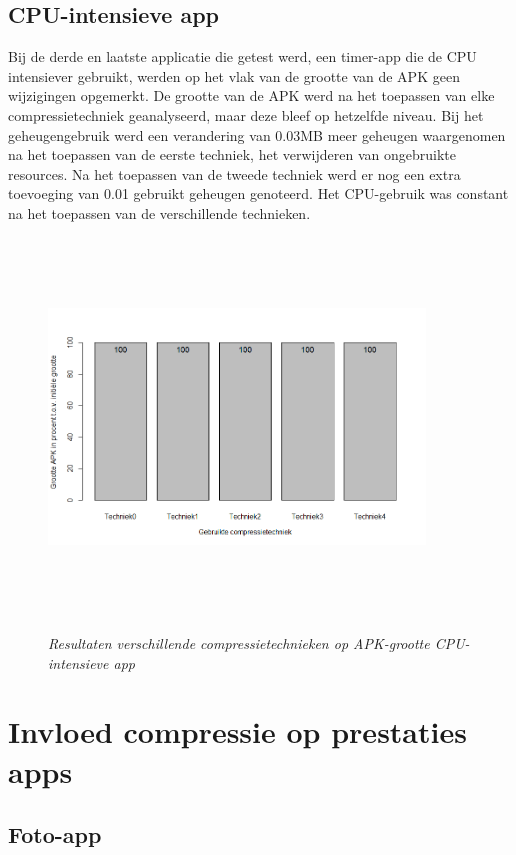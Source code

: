 \subsection{CPU-intensieve app}
Bij de derde en laatste applicatie die getest werd, een timer-app die de CPU intensiever gebruikt, werden op het vlak van de grootte van de APK geen wijzigingen opgemerkt. De grootte van de APK werd na het toepassen van elke compressietechniek geanalyseerd, maar deze bleef op hetzelfde niveau. Bij het geheugengebruik werd een verandering van 0.03MB meer geheugen waargenomen na het toepassen van de eerste techniek, het verwijderen van ongebruikte resources. Na het toepassen van de tweede techniek werd er nog een extra toevoeging van 0.01 gebruikt geheugen genoteerd. Het CPU-gebruik was constant na het toepassen van de verschillende technieken.
\begin{figure}[H]
	\centering
	\caption{\textit{Resultaten verschillende compressietechnieken op APK-grootte CPU-intensieve app}}
	\includegraphics[width=10cm, height=10cm, keepaspectratio]{img/Rplot02}\\[.5cm]
	
\end{figure}

\section{Invloed compressie op prestaties apps}
\label{sec:invloedcompressie}
\subsection{Foto-app}

